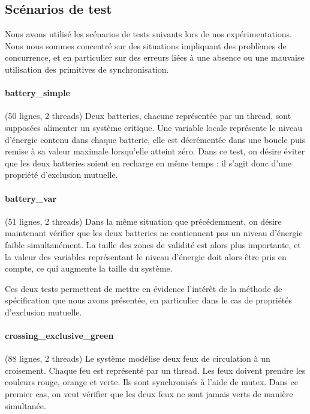 \subsection{Scénarios de test}

Nous avons utilisé les scénarios de tests suivants lors de nos expérimentations.
Nous nous sommes concentré sur des situations impliquant des problèmes de
concurrence, et en particulier sur des erreurs liées à une absence ou une
mauvaise utilisation des primitives de synchronisation.

\paragraph{battery\_simple}
(50 lignes, 2 threads)
Deux batteries, chacune représentée par un thread, sont supposées alimenter un
système critique. Une variable locale représente le niveau d'énergie contenu
dans chaque batterie, elle est décrémentée dans une boucle puis remise à sa valeur maximale
lorsqu'elle atteint zéro. Dans ce test, on désire éviter que les deux
batteries soient en recharge en même temps : il s'agit donc d'une propriété
d'exclusion mutuelle.

\paragraph{battery\_var}
(51 lignes, 2 threads)
Dans la même situation que précédemment, on désire maintenant vérifier que les
deux batteries ne contiennent pas un niveau d'énergie faible simultanément. La
taille des zones de validité est alors plus importante, et la valeur des
variables représentant le niveau d'énergie doit alors être pris en compte, ce
qui augmente la taille du système.

Ces deux tests permettent de mettre en évidence l'intérêt de la méthode de
spécification que nous avons présentée, en particulier dans le cas de propriétés
d'exclusion mutuelle.


\paragraph{crossing\_exclusive\_green}
(88 lignes, 2 threads)
Le système modélise deux feux de circulation à un croisement. Chaque feu est
représenté par un thread. Les feux doivent prendre les couleurs rouge, orange et
verte. Ils sont synchronisés à l'aide de mutex. Dans ce premier cas, on veut
vérifier que les deux feux ne sont jamais verts de manière simultanée.

